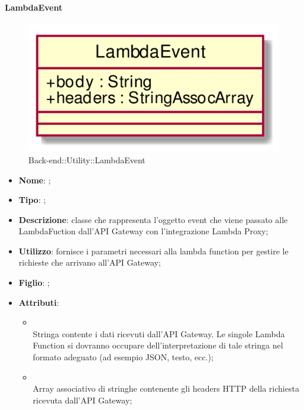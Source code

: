 \hypertarget{LambdaEvent_label}{\paragraph{LambdaEvent}}
\begin{figure}[h]
	\centering
	\includegraphics[width=\textwidth,height=\textheight,keepaspectratio]{images/ClassLambdaEvent.png}
	\caption{Back-end::Utility::LambdaEvent}
\end{figure}
\begin{itemize}
	\item \textbf{Nome}: ;
	\item \textbf{Tipo}: ;
	\item \textbf{Descrizione}: classe che rappresenta l'oggetto event che viene passato alle LambdaFuction dall'API Gateway con l'integrazione Lambda Proxy;
	\item \textbf{Utilizzo}: fornisce i parametri necessari alla lambda function per gestire le richieste che arrivano all'API Gateway;
	\item \textbf{Figlio}: ;
	\item \textbf{Attributi}:
	\begin{itemize}
		\item[]  \\
		Stringa contente i dati ricevuti dall'API Gateway. Le singole Lambda  Function si dovranno occupare dell'interpretazione di tale stringa nel formato adeguato (ad esempio JSON, testo, ecc.);
		\item[]  \\
		Array associativo di stringhe contenente gli headers HTTP della richiesta ricevuta dall'API Gateway;
	\end{itemize}
\end{itemize}

